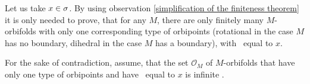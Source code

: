 Let us take $x\in {\sigma}$. 
By using observation \ref{simplification of the finiteness theorem} it is only needed to prove, 
that for any $M$, there are only finitely many $M$-orbifolds with only one 
corresponding type of orbipoints 
(rotational in the case $M$ has no boundary, dihedral in the case $M$ has a boundary), 
with \Eoc\ equal to $x$. 




For the sake of contradiction, assume, that the set $\mathcal{O}_M$
of $M$-orbifolds that have only one type of orbipoints and have \Eoc\ equal to $x$ is infinite 
.




